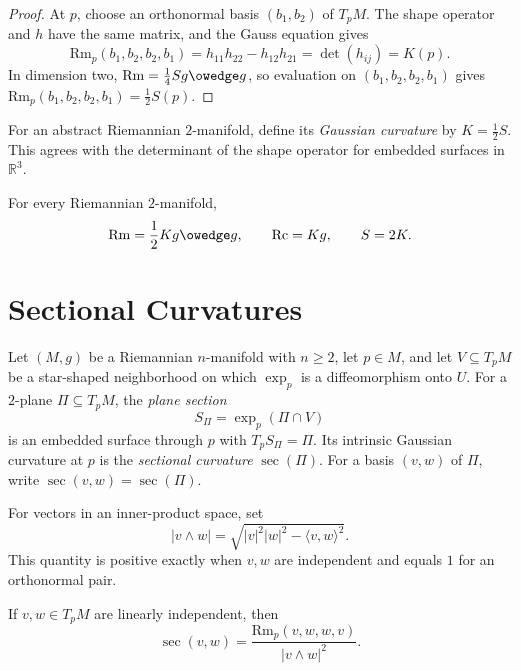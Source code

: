 \begin{proof}
\sketch
At $p$, choose an orthonormal basis $(b_1,b_2)$ of $T_pM$.  The shape
operator and $h$ have the same matrix, and the Gauss equation gives
\[
\mathrm{Rm}_p(b_1,b_2,b_2,b_1)
=h_{11}h_{22}-h_{12}h_{21}=\det(h_{ij})=K(p).
\]
In dimension two,
$\mathrm{Rm}=\tfrac14Sg\owedge g$, so evaluation on
$(b_1,b_2,b_2,b_1)$ gives $\mathrm{Rm}_p(b_1,b_2,b_2,b_1)=\tfrac12S(p)$.
\end{proof}

For an abstract Riemannian $2$-manifold, define its \emph{Gaussian curvature}
by $K=\tfrac12S$.  This agrees with the determinant of the shape operator for
embedded surfaces in $\mathbb R^3$.

\begin{corollary}
\label{cor:riemann-two-manifold-curvatures}
For every Riemannian $2$-manifold,
\[
\mathrm{Rm}=\frac12K g\owedge g,
\qquad
\mathrm{Rc}=Kg,
\qquad
S=2K.
\]
\end{corollary}

\section{Sectional Curvatures}

Let $(M,g)$ be a Riemannian $n$-manifold with $n\geq2$, let $p\in M$, and
let $V\subseteq T_pM$ be a star-shaped neighborhood on which $\exp_p$ is a
diffeomorphism onto $U$.  For a $2$-plane $\Pi\subseteq T_pM$, the
\emph{plane section}
\[
S_\Pi=\exp_p(\Pi\cap V)
\]
is an embedded surface through $p$ with $T_pS_\Pi=\Pi$.  Its intrinsic
Gaussian curvature at $p$ is the \emph{sectional curvature} $\sec(\Pi)$.
For a basis $(v,w)$ of $\Pi$, write $\sec(v,w)=\sec(\Pi)$.

For vectors in an inner-product space, set
\begin{equation}
|v\wedge w|=\sqrt{|v|^2|w|^2-\langle v,w\rangle^2}. \tag{8.27}
\end{equation}
This quantity is positive exactly when $v,w$ are independent and equals $1$
for an orthonormal pair.

\begin{proposition}
\label{prop:sectional-curvature-formula}
If $v,w\in T_pM$ are linearly independent, then
\[
\sec(v,w)=\frac{\mathrm{Rm}_p(v,w,w,v)}{|v\wedge w|^2}.
\]
\end{proposition}

